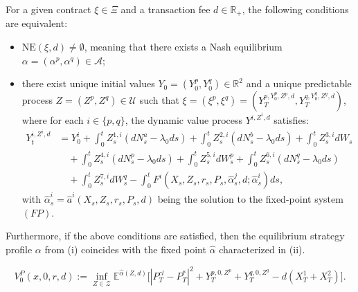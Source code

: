 \documentclass[10pt,a4paper]{amsart}
\begin{document}
\begin{theorem}
\label{thm:main}
For a given contract $\xi \in \Xi$ and a transaction fee $d \in \mathbb{R}_+$, the following conditions are equivalent:

\begin{itemize}
    \item[(i)] $\text{NE}(\xi,d) \neq \emptyset$, meaning that there exists a Nash equilibrium $\alpha = ( \alpha^p,  \alpha^q) \in \mathcal{A}$;
    \item[(ii)] there exist unique initial values $Y_0 = (Y_0^p, Y_0^q) \in \mathbb{R}^2$ and a unique predictable process $Z = (Z^{p},Z^{q}) \in \mathcal{U}$ such that $\xi = (\xi^p, \xi^q) = (Y_T^{p, Y_0^p, Z^p, d}, Y_T^{q, Y_0^q, Z^q, d})$, where for each $i \in \{p,q\}$, the dynamic value process $Y^{i, Z^i, d}$ satisfies:
    \begin{align*}
        Y_t^{i,Z^i,d} &= Y^i_0 + \int_0^t Z^{1,i}_s (dN^{a}_s - \lambda_0 ds) + \int_0^t Z^{2,i}_s (dN^{b}_s - \lambda_0 ds) + \int_0^t Z^{3,i}_s dW_s \\
        &\quad + \int_0^t Z^{4,i}_s (dN^p_s - \lambda_0 ds) + \int_0^t Z^{5,i}_s dW^{p}_s + \int_0^t Z^{6,i}_s (dN^{q}_s - \lambda_0 ds) \\
        &\quad + \int_0^t Z^{7,i}_s dW^{q}_s - \int_0^t F^i(X_s,Z_s,r_s,P_s, \hat{\alpha}^j_s,d;\hat{\alpha}^i_s) ds,
    \end{align*}
    with $\hat{\alpha}^i_s = \hat{a}^i(X_s,Z_s,r_s,P_s,d)$ being the solution to the fixed-point system $(FP)$.
\end{itemize}

Furthermore, if the above conditions are satisfied, then the equilibrium strategy profile $\alpha$ from (i) coincides with the fixed point $\hat{\alpha}$ characterized in (ii).
\end{theorem}

\begin{equation}\label{opt:tilderho} 
  V^P_0(x,0,r,d):=  \inf_{Z \in \mathcal{Z}} \mathbb{E}^{\hat{\alpha}(Z,d)}\Big[ |P^{cl}_T - P_T^{*}|^2 + Y_T^{p, 0, Z^p} + Y_T^{q, 0, Z^q} - d(X_T^1 + X_T^2) \Big].
\end{equation}
\end{document}
